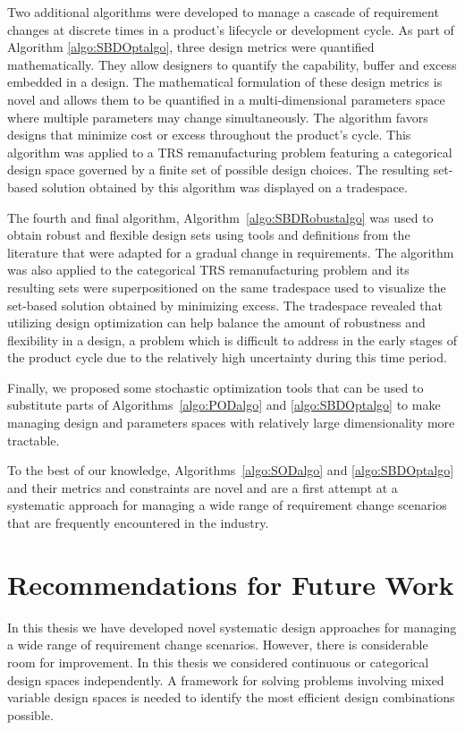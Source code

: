 Two additional algorithms were developed to manage a cascade of requirement changes at discrete times in a product's lifecycle or development cycle. As part of Algorithm \ref{algo:SBDOptalgo}, three design metrics were quantified mathematically. They allow designers to quantify the capability, buffer and excess embedded in a design. The mathematical formulation of these design metrics is novel and allows them to be quantified in a multi-dimensional parameters space where multiple parameters may change simultaneously. The algorithm favors designs that minimize cost or excess throughout the product's cycle. This algorithm was applied to a \ac{TRS} remanufacturing problem featuring a categorical design space governed by a finite set of possible design choices. The resulting set-based solution obtained by this algorithm was displayed on a tradespace.

The fourth and final algorithm, Algorithm~\ref{algo:SBDRobustalgo} was used to obtain robust and flexible design sets using tools and definitions from the literature that were adapted for a gradual change in requirements. The algorithm was also applied to the categorical \ac{TRS} remanufacturing problem and its resulting sets were superpositioned on the same tradespace used to visualize the set-based solution obtained by minimizing excess. The tradespace revealed that utilizing design optimization can help balance the amount of robustness and flexibility in a design, a problem which is difficult to address in the early stages of the product cycle due to the relatively high uncertainty during this time period.

Finally, we proposed some stochastic optimization tools that can be used to substitute parts of Algorithms~\ref{algo:PODalgo} and \ref{algo:SBDOptalgo} to make managing design and parameters spaces with relatively large dimensionality more tractable.

To the best of our knowledge, Algorithms~\ref{algo:SODalgo} and \ref{algo:SBDOptalgo} and their metrics and constraints are novel and are a first attempt at a systematic approach for managing a wide range of requirement change scenarios that are frequently encountered in the industry.

\section{Recommendations for Future Work}
\label{sec:futurework}

In this thesis we have developed novel systematic design approaches for managing a wide range of requirement change scenarios. However, there is considerable room for improvement. In this thesis we considered continuous or categorical design spaces independently. A framework for solving problems involving mixed variable design spaces is needed to identify the most efficient design combinations possible. 


